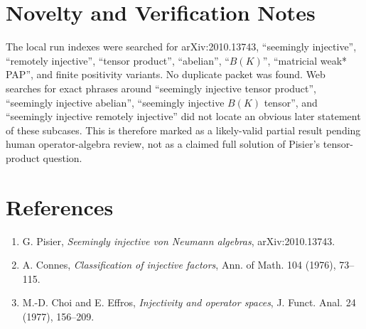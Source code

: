 \documentclass[11pt]{article}
\begin{document}
\section*{Novelty and Verification Notes}

The local run indexes were searched for arXiv:2010.13743, ``seemingly
injective'', ``remotely injective'', ``tensor product'', ``abelian'',
``\(B(K)\)'', ``matricial weak* PAP'', and finite positivity variants. No
duplicate packet was found. Web searches for exact phrases around
``seemingly injective tensor product'', ``seemingly injective abelian'',
``seemingly injective \(B(K)\) tensor'', and ``seemingly injective remotely
injective'' did not locate an obvious later statement of these subcases.
This is therefore marked as a likely-valid partial result pending human
operator-algebra review, not as a claimed full solution of Pisier's
tensor-product question.

\section*{References}

\begin{enumerate}
\item G. Pisier, \emph{Seemingly injective von Neumann algebras},
  arXiv:2010.13743.
\item A. Connes, \emph{Classification of injective factors}, Ann. of Math.
  104 (1976), 73--115.
\item M.-D. Choi and E. Effros, \emph{Injectivity and operator spaces},
  J. Funct. Anal. 24 (1977), 156--209.
\end{enumerate}
\end{document}
